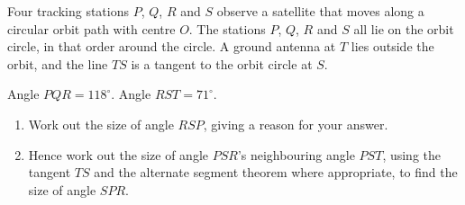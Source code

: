 \begin{question}
\noindent Four tracking stations $P$, $Q$, $R$ and $S$ observe a satellite that moves along a circular orbit path with centre $O$. The stations $P$, $Q$, $R$ and $S$ all lie on the orbit circle, in that order around the circle. A ground antenna at $T$ lies outside the orbit, and the line $TS$ is a tangent to the orbit circle at $S$.

Angle $PQR = 118^\circ$. Angle $RST = 71^\circ$.

\begin{center}
\end{center}

\begin{enumerate}
    \item[(a)] Work out the size of angle $RSP$, giving a reason for your answer.

    \vspace{3.5cm}

    \item[(b)] Hence work out the size of angle $PSR$'s neighbouring angle $PST$, using the tangent $TS$ and the alternate segment theorem where appropriate, to find the size of angle $SPR$.

    \vspace{4cm}
\end{enumerate}
\end{question}
